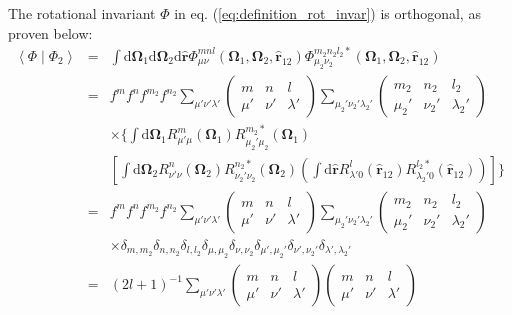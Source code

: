 The rotational invariant $\Phi$ in eq. (\ref{eq:definition_rot_invar})
is orthogonal, as proven below:
\begin{eqnarray}
\left\langle \Phi\mid\Phi_{2}\right\rangle  & = & \int\mathrm{d}\mathbf{\Omega}_{1}\mathrm{d}\mathbf{\Omega}_{2}\mathrm{d}\hat{\mathbf{r}}\Phi_{\mu\nu}^{mnl}(\mathbf{\Omega}_{1},\mathbf{\Omega}_{2},\mathbf{\hat{r}}_{12})\Phi_{\mu_{2}\nu_{2}}^{m_{2}n_{2}l_{2}*}(\mathbf{\Omega}_{1},\mathbf{\Omega}_{2},\mathbf{\hat{r}}_{12})\nonumber \\
 & = & f^{m}f^{n}f^{m_{2}}f^{n_{2}}\sum_{\mu'\nu'\lambda'}\left(\begin{array}{ccc}
m & n & l\\
\mu' & \nu' & \lambda'
\end{array}\right)\sum_{\mu_{2}'\nu_{2}'\lambda_{2}'}\left(\begin{array}{ccc}
m_{2} & n_{2} & l_{2}\\
\mu_{2}' & \nu_{2}' & \lambda_{2}'
\end{array}\right)\nonumber \\
 &  & \times\{\int\mathrm{d}\mathbf{\Omega}_{1}R_{\mu'\mu}^{m}(\mathbf{\Omega}_{1})R_{\mu_{2}'\mu_{2}}^{m_{2}*}(\mathbf{\Omega}_{1})\nonumber \\
 &  & \left[\int\mathrm{d}\mathbf{\Omega}_{2}R_{\nu'\nu}^{n}(\mathbf{\Omega}_{2})R_{\nu_{2}'\nu_{2}}^{n_{2}*}(\mathbf{\Omega}_{2})\left(\int\mathrm{d}\hat{\mathbf{r}}R_{\lambda'0}^{l}(\mathbf{\hat{r}}_{12})R_{\lambda_{2}'0}^{l_{2}*}(\mathbf{\hat{r}}_{12})\right)\right]\}\nonumber \\
 & = & f^{m}f^{n}f^{m_{2}}f^{n_{2}}\sum_{\mu'\nu'\lambda'}\left(\begin{array}{ccc}
m & n & l\\
\mu' & \nu' & \lambda'
\end{array}\right)\sum_{\mu_{2}'\nu_{2}'\lambda_{2}'}\left(\begin{array}{ccc}
m_{2} & n_{2} & l_{2}\\
\mu_{2}' & \nu_{2}' & \lambda_{2}'
\end{array}\right)\nonumber \\
 &  & \times\delta_{m,m_{2}}\delta_{n,n_{2}}\delta_{l,l_{2}}\delta_{\mu,\mu_{2}}\delta_{\nu,\nu_{2}}\delta_{\mu',\mu_{2}'}\delta_{\nu',\nu_{2}'}\delta_{\lambda',\lambda_{2}'}\nonumber \\
 & = & \left(2l+1\right)^{-1}\sum_{\mu'\nu'\lambda'}\left(\begin{array}{ccc}
m & n & l\\
\mu' & \nu' & \lambda'
\end{array}\right)\left(\begin{array}{ccc}
m & n & l\\
\mu' & \nu' & \lambda'
\end{array}\right)
\end{eqnarray}
